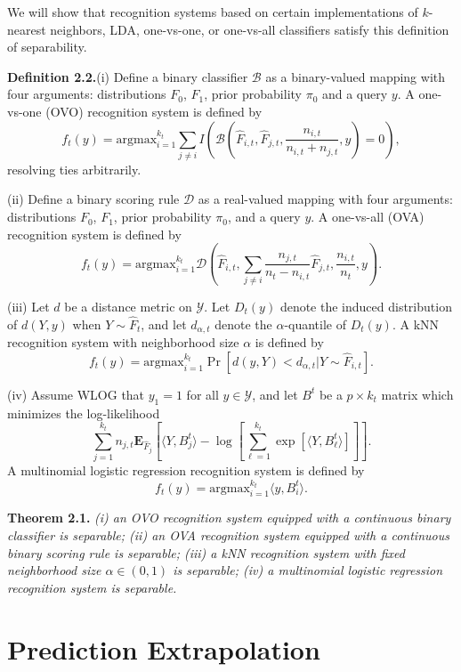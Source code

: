 \documentclass{article}
\newcommand{\E}{\textbf{E}}
\newcommand{\argmax}{\text{argmax}}
\begin{document}
We will show that recognition systems based on certain implementations of $k$-nearest neighbors, LDA, one-vs-one, or one-vs-all classifiers satisfy this definition of separability.  

\textbf{Definition 2.2.}(i)  Define a binary classifier $\mathcal{B}$ as a binary-valued mapping with four arguments: distributions $F_0$, $F_1$, prior probability $\pi_0$ and a query $y$.  A one-vs-one (OVO) recognition system is defined by
\[
f_t(y) = \argmax_{i=1}^{k_t} \sum_{j \neq i} I\left(\mathcal{B}(\hat{F}_{i, t}, \hat{F}_{j, t}, \frac{n_{i, t}}{n_{i, t} + n_{j, t}}, y)=0\right),
\]
resolving ties arbitrarily.

(ii) Define a binary scoring rule $\mathcal{D}$ as a real-valued mapping with four arguments:
distributions $F_0$, $F_1$, prior probability $\pi_0$, and a query $y$. 
A one-vs-all (OVA) recognition system is defined by
\[
f_t(y) = \argmax_{i=1}^{k_t} \mathcal{D}\left(\hat{F}_{i, t}, \sum_{j\neq i} \frac{n_{j, t}}{n_t - n_{i, t}}\hat{F}_{j, t}, \frac{n_{i, t}}{n_t}, y\right).
\]

(iii) Let $d$ be a distance metric on $\mathcal{Y}$.
Let $D_t(y)$ denote the induced distribution of $d(Y, y)$ when $Y \sim \hat{F}_t$,
and let $d_{\alpha, t}$ denote the $\alpha$-quantile of $D_t(y)$.
A kNN recognition system with neighborhood size $\alpha$ is defined by
\[
f_t(y) = \argmax_{i=1}^{k_t} \Pr[d(y, Y) < d_{\alpha, t} |Y \sim \hat{F}_{i, t}].
\]

(iv) Assume WLOG that $y_1 = 1$ for all $y \in \mathcal{Y}$, and
let $B^t$ be a $p \times k_t$ matrix which minimizes the log-likelihood
\[
\sum_{j=1}^{k_t}n_{j, t}\E_{\hat{F}_j}\left[\langle Y, B^t_j \rangle - \log\left[\sum_{\ell=1}^{k_t} \exp[\langle Y, B^t_\ell \rangle]\right]\right].
\]
A multinomial logistic regression recognition system is defined by
\[
f_t(y) = \argmax_{i=1}^{k_t} \langle y, B^t_i\rangle.
\]

\textbf{Theorem 2.1.} \emph{(i) an OVO recognition system equipped with a continuous binary classifier is separable; (ii) an OVA recognition system equipped with a continuous binary scoring rule is separable;
(iii) a kNN recognition system with fixed neighborhood size $\alpha \in (0, 1)$ is separable; (iv) a multinomial logistic regression recognition system is separable.}

\section{Prediction Extrapolation}
\end{document}
